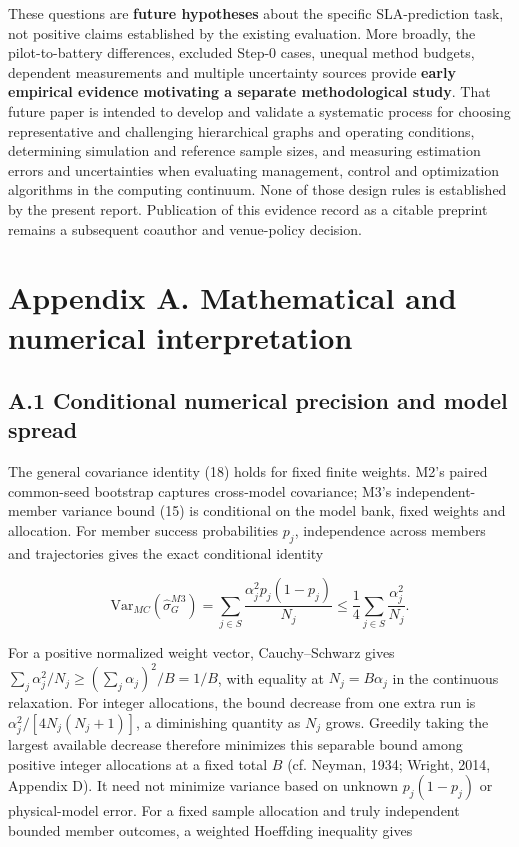 \documentclass[10pt,a4paper]{article}
\begin{document}
These questions are \textbf{future hypotheses} about the specific SLA-prediction task, not positive claims established by the existing evaluation. More broadly, the pilot-to-battery differences, excluded Step-0 cases, unequal method budgets, dependent measurements and multiple uncertainty sources provide \textbf{early empirical evidence motivating a separate methodological study}. That future paper is intended to develop and validate a systematic process for choosing representative and challenging hierarchical graphs and operating conditions, determining simulation and reference sample sizes, and measuring estimation errors and uncertainties when evaluating management, control and optimization algorithms in the computing continuum. None of those design rules is established by the present report. Publication of this evidence record as a citable preprint remains a subsequent coauthor and venue-policy decision.

\section*{Appendix A. Mathematical and numerical interpretation}

\subsection*{A.1 Conditional numerical precision and model spread}

The general covariance identity (18) holds for fixed finite weights. M2's paired common-seed bootstrap captures cross-model covariance; M3's independent-member variance bound (15) is conditional on the model bank, fixed weights and allocation. For member success probabilities $p_j$, independence across members and trajectories gives the exact conditional identity

\begin{equation*}
\mathrm{Var}_{MC}(\widehat\sigma_G^{M3})
=\sum_{j\in S}\frac{\alpha_j^2p_j(1-p_j)}{N_j}
\le\frac14\sum_{j\in S}\frac{\alpha_j^2}{N_j}.
\end{equation*}

For a positive normalized weight vector, Cauchy--Schwarz gives $\sum_j\alpha_j^2/N_j\ge(\sum_j\alpha_j)^2/B=1/B$, with equality at $N_j=B\alpha_j$ in the continuous relaxation. For integer allocations, the bound decrease from one extra run is $\alpha_j^2/[4N_j(N_j+1)]$, a diminishing quantity as $N_j$ grows. Greedily taking the largest available decrease therefore minimizes this separable bound among positive integer allocations at a fixed total $B$ (cf. Neyman, 1934; Wright, 2014, Appendix D). It need not minimize variance based on unknown $p_j(1-p_j)$ or physical-model error. For a fixed sample allocation and truly independent bounded member outcomes, a weighted Hoeffding inequality gives
\end{document}
